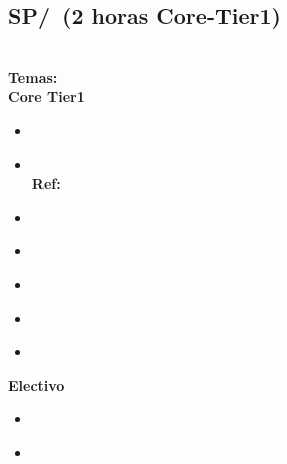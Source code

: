 \subsection{SP/\SPIntellectualProperty~(2 horas Core-Tier1)}\label{sec:BOK:SPIntellectualProperty}
\SPIntellectualPropertyDescription\\
\noindent \textbf{Temas:}\\
\noindent \textbf{Core Tier1}
\begin{itemize}
	\item \SPIntellectualPropertyTopicPhilosophical\label{sec:BOK:SPIntellectualPropertyTopicPhilosophical}
	\item \SPIntellectualPropertyTopicIntellectual\xspace \\ \textbf{Ref:} \label{sec:BOK:SPIntellectualPropertyTopicIntellectual}
	\item \SPIntellectualPropertyTopicIntangible\label{sec:BOK:SPIntellectualPropertyTopicIntangible}
	\item \SPIntellectualPropertyTopicLegal\label{sec:BOK:SPIntellectualPropertyTopicLegal}
	\item \SPIntellectualPropertyTopicDigital\label{sec:BOK:SPIntellectualPropertyTopicDigital}
	\item \SPIntellectualPropertyTopicCopyrights\label{sec:BOK:SPIntellectualPropertyTopicCopyrights}
	\item \SPIntellectualPropertyTopicPlagiarism\label{sec:BOK:SPIntellectualPropertyTopicPlagiarism}
\end{itemize}

\noindent \textbf{Electivo}
\begin{itemize}
	\item \SPIntellectualPropertyTopicFoundations\label{sec:BOK:SPIntellectualPropertyTopicFoundations}
	\item \SPIntellectualPropertyTopicSoftware\label{sec:BOK:SPIntellectualPropertyTopicSoftware}
\end{itemize}


